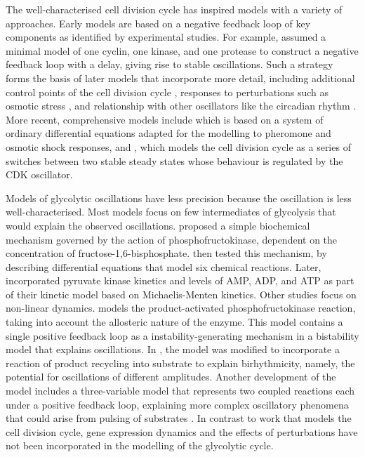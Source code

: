 The well-characterised cell division cycle has inspired models with a variety of approaches.
Early models are based on a negative feedback loop of key components as identified by experimental studies.
For example, \textcite{goldbeterMinimalCascadeModel1991} assumed a minimal model of one cyclin, one kinase, and one protease to construct a negative feedback loop with a delay, giving rise to stable oscillations.
Such a strategy forms the basis of later models that incorporate more detail, including additional control points of the cell division cycle \parencite{chenIntegrativeAnalysisCell2004}, responses to perturbations such as osmotic stress \parencite{adroverTimeDependentQuantitativeMulticomponent2011}, and relationship with other oscillators like the circadian rhythm \parencite{gerardEntrainmentMammalianCell2012, charvinForcedPeriodicExpression2009, droinLowdimensionalDynamicsTwo2019}.
More recent, comprehensive models include \textcite{adlerYeastCellCycle2022} which is based on a system of ordinary differential equations adapted for the modelling to pheromone and osmotic shock responses, and \textcite{novakMitoticKinaseOscillation2022}, which models the cell division cycle as a series of switches between two stable steady states whose behaviour is regulated by the CDK oscillator.

Models of glycolytic oscillations have less precision because the oscillation is less well-characterised.
Most models focus on few intermediates of glycolysis that would explain the observed oscillations.
\textcite{ghoshOscillationsGlycolyticIntermediates1964} proposed a simple biochemical mechanism governed by the action of phosphofructokinase, dependent on the concentration of fructose-1,6-bisphosphate.
\textcite{higginsChemicalMechanismOscillation1964} then tested this mechanism, by describing differential equations that model six chemical reactions.
Later, \textcite{termoniaOscillationsControlFeatures1981} incorporated pyruvate kinase kinetics and levels of AMP, ADP, and ATP as part of their kinetic model based on Michaelis-Menten kinetics.
Other studies focus on non-linear dynamics.
\textcite{goldbeterDissipativeStructuresAllosteric1972} models the product-activated phosphofructokinase reaction, taking into account the allosteric nature of the enzyme.
This model contains a single positive feedback loop as a instability-generating mechanism in a bistability model that explains oscillations.
In \textcite{moranOnsetBirhythmicityRegulated1984}, the model was modified to incorporate a reaction of product recycling into substrate to explain birhythmicity, namely, the potential for oscillations of different amplitudes.
Another development of the model includes a three-variable model that represents two coupled reactions each under a positive feedback loop, explaining more complex oscillatory phenomena that could arise from pulsing of substrates \parencite{decrolyBirhythmicityChaosOther1982}.
In contrast to work that models the cell division cycle, gene expression dynamics and the effects of perturbations have not been incorporated in the modelling of the glycolytic cycle.

